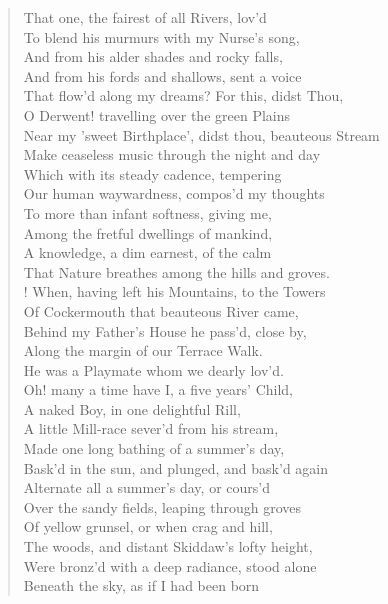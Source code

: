 \begin{verse}
That one, the fairest of all Rivers, lov'd	  \\
To blend his murmurs with my Nurse's song,  \\
And from his alder shades and rocky falls,  \\
And from his fords and shallows, sent a voice  \\
That flow'd along my dreams? For this, didst Thou,  \\
O Derwent! travelling over the green Plains	  \\
Near my 'sweet Birthplace', didst thou, beauteous Stream  \\
Make ceaseless music through the night and day  \\
Which with its steady cadence, tempering  \\
Our human waywardness, compos'd my thoughts  \\
To more than infant softness, giving me,	  \\
Among the fretful dwellings of mankind,  \\
A knowledge, a dim earnest, of the calm  \\
That Nature breathes among the hills and groves.  \\!
When, having left his Mountains, to the Towers  \\
Of Cockermouth that beauteous River came,	  \\
Behind my Father's House he pass'd, close by,  \\
Along the margin of our Terrace Walk.  \\
He was a Playmate whom we dearly lov'd.  \\
Oh! many a time have I, a five years' Child,  \\
A naked Boy, in one delightful Rill,	  \\
A little Mill-race sever'd from his stream,  \\
Made one long bathing of a summer's day,  \\
Bask'd in the sun, and plunged, and bask'd again  \\
Alternate all a summer's day, or cours'd  \\
Over the sandy fields, leaping through groves	  \\
Of yellow grunsel, or when crag and hill,  \\
The woods, and distant Skiddaw's lofty height,  \\
Were bronz'd with a deep radiance, stood alone  \\
Beneath the sky, as if I had been born  \\

\end{verse}
